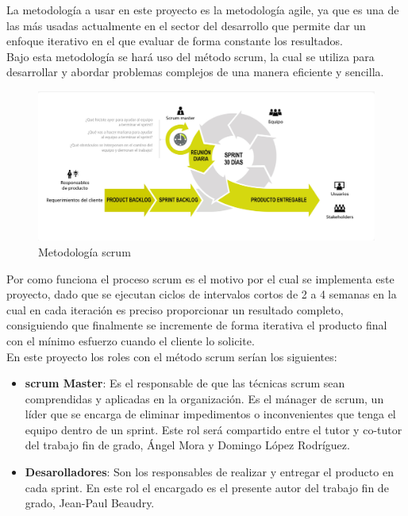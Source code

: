 \documentclass[../../main.tex]{subfiles}
\begin{document}
La metodología a usar en este proyecto es la metodología \Gls{agile}, ya que es una de las más usadas actualmente en el sector del desarrollo que permite dar un enfoque iterativo en el que evaluar de forma constante los resultados. \\
Bajo esta metodología se hará uso del método \Gls{scrum}, la cual se utiliza para desarrollar y abordar problemas complejos de una manera eficiente y sencilla.

\begin{figure}[H]
\centering
\includegraphics[width=1\textwidth]{images/introduccion/scrum3.jpg}
\caption{Metodología \Gls{scrum}}
\end{figure}

Por como funciona el proceso \Gls{scrum} es el motivo por el cual se implementa este proyecto, dado que se ejecutan ciclos de intervalos cortos de 2 a 4 semanas en la cual en cada iteración es preciso proporcionar un resultado completo, consiguiendo que finalmente se incremente de forma iterativa el producto final con el mínimo esfuerzo cuando el cliente lo solicite. \\

En este proyecto los roles con el método \Gls{scrum} serían los siguientes:
\begin{itemize}
    \item \textbf{\Gls{scrum} Master}: Es el responsable de que las técnicas \Gls{scrum} sean comprendidas y aplicadas en la organización. Es el mánager de \Gls{scrum}, un líder que se encarga de eliminar impedimentos o inconvenientes que tenga el equipo dentro de un sprint. Este rol será compartido entre el tutor y co-tutor del trabajo fin de grado, Ángel Mora y Domingo López Rodríguez.
    \item \textbf{Desarolladores}: Son los responsables de realizar y entregar el producto en cada sprint. En este rol el encargado es el presente autor del trabajo fin de grado, Jean-Paul Beaudry. 
\end{itemize}
\end{document}
